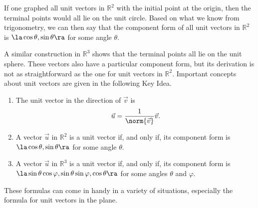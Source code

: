 If one graphed all unit vectors in $\mathbb{R}^2$ with the initial point at the origin, then the terminal points would all lie on the unit circle. Based on what we know from trigonometry, we can then say that the component form of all unit vectors in $\mathbb{R}^2$ is $\la \cos\theta,\sin\theta\ra$ for some angle $\theta$.

A similar construction in $\mathbb{R}^3$ shows that the terminal points all lie on the unit sphere. These vectors also have a particular component form, but its derivation is not as straightforward as the one for unit vectors in $\mathbb{R}^2$. Important concepts about unit vectors are given in the  following Key Idea. 

{\begin{enumerate}
\item		The unit vector in the direction of $\vec v$ is 
\[
 \vec u = \frac1{\norm{\vec v}} \vec v.
\]

\item A vector $\vec u$ in $\mathbb{R}^2$ is a unit vector if, and only if, its component form is $\la \cos\theta,\sin\theta\ra$ for some angle $\theta$.
	\item		A vector $\vec u$ in $\mathbb{R}^3$ is a unit vector if, and only if, its component form is $\la \sin\theta\cos\varphi,\sin\theta\sin\varphi,\cos\theta\ra$ for some angles $\theta$ and $\varphi$.
\end{enumerate}
}

These formulas can come in handy in a variety of situations, especially the formula for unit vectors in the plane.\\



